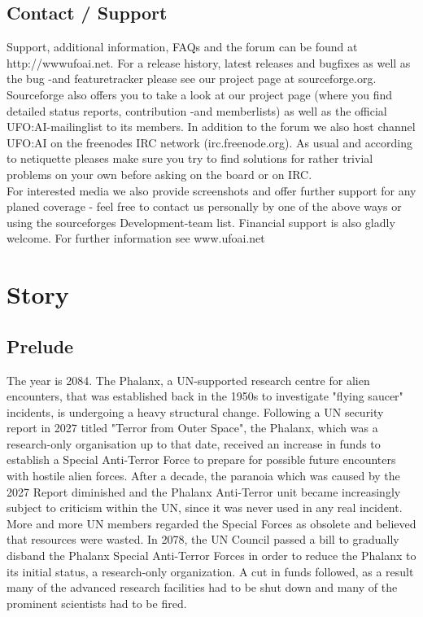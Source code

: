 \subsection{Contact / Support}
Support, additional information, FAQs and the forum can be found at http://wwwufoai.net. %
For a release history, latest releases and bugfixes as well as the bug -and featuretracker please see our project page at sourceforge.org. %
Sourceforge also offers you to take a look at our project page (where you find detailed status reports, contribution -and memberlists) as well as the official UFO:AI-mailinglist to its members. In addition to the forum we also host channel UFO:AI on the freenodes IRC network (irc.freenode.org).  As usual and according to netiquette pleases make sure you try to find solutions for rather trivial problems on your own before asking on the board or on IRC.\\
For interested media we also provide screenshots and offer further support for any planed coverage - feel free to contact us personally by one of the above ways or using the sourceforges Development-team list.
Financial support is also gladly welcome. For further information see www.ufoai.net

\newpage

\section{Story}
\subsection{Prelude}
The year is 2084. The Phalanx, a UN-supported research centre for alien encounters, that was established back in the 1950s to investigate "flying saucer" incidents, is undergoing a heavy structural change. Following a UN security report in 2027 titled "Terror from Outer Space", the Phalanx, which was a research-only organisation up to that date, received an increase in funds to establish a Special Anti-Terror Force to prepare for possible future encounters with hostile alien forces. After a decade, the paranoia which was caused by the 2027 Report diminished and the Phalanx Anti-Terror unit became increasingly subject to criticism within the UN, since it was never used in any real incident. More and more UN members regarded the Special Forces as obsolete and believed that resources were wasted. In 2078, the UN Council passed a bill to gradually disband the Phalanx Special Anti-Terror Forces in order to reduce the Phalanx to its initial status, a research-only organization. A cut in funds followed, as a result many of the advanced research facilities had to be shut down and many of the prominent scientists had to be fired.

